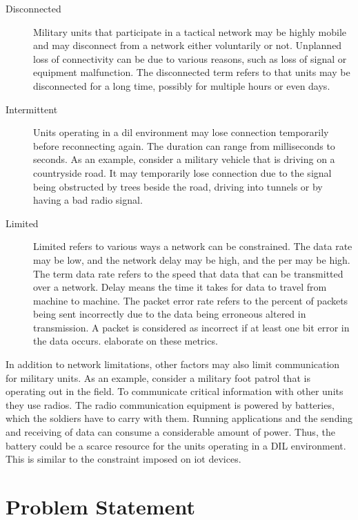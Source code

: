 \begin{description}
\item[Disconnected]

Military units that participate in a tactical network may be highly mobile and
may disconnect from a network either voluntarily or not. Unplanned loss of
connectivity can be due to various reasons, such as loss of signal or equipment
malfunction. The disconnected term refers to that units may be disconnected for
a long time, possibly for multiple hours or even days.

\item[Intermittent]

Units operating in a \gls{dil} environment may lose connection temporarily
before reconnecting again. The duration can range from milliseconds to seconds.
As an example, consider a military vehicle that is driving on a countryside
road. It may temporarily lose connection due to the signal being obstructed by
trees beside the road, driving into tunnels or by having a bad radio signal.

\item[Limited] Limited refers to various ways a network can be constrained. The
data rate may be low, and the network delay may be high, and the \gls{per} may
be high. The term data rate refers to the speed that data that can be
transmitted over a network. Delay means the time it takes for data to travel
from machine to machine. The packet error rate refers to the percent of packets
being sent incorrectly due to the data being erroneous altered in transmission.
A packet is considered as incorrect if at least one bit error in the data
occurs.  elaborate on these metrics.

\end{description}

In addition to network limitations, other factors may also limit communication
for military units. As an example, consider a military foot patrol that is
operating out in the field. To communicate critical information with other units
they use radios. The radio communication equipment is powered by batteries,
which the soldiers have to carry with them. Running applications and the sending
and receiving of data can consume a considerable amount of power. Thus, the
battery could be a scarce resource for the units operating in a DIL environment.
This is similar to the constraint imposed on \gls{iot} devices.


\section{Problem Statement}
\label{section:problem-statement}

